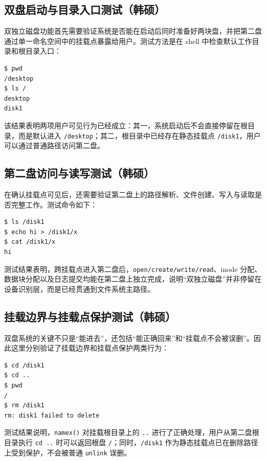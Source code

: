\documentclass[12pt,a4paper]{ctexart}
\begin{document}
\subsection{双盘启动与目录入口测试（韩硕）}

双独立磁盘功能首先需要验证系统是否能在启动后同时准备好两块盘，并把第二盘通过单一命名空间中的挂载点暴露给用户。测试方法是在 shell 中检查默认工作目录和根目录入口：

\begin{lstlisting}[caption={双盘启动后的入口检查}]
$ pwd
/desktop
$ ls /
desktop
disk1
\end{lstlisting}

该结果表明两项用户可见行为已经成立：其一，系统启动后不会直接停留在根目录，而是默认进入 \texttt{/desktop}；其二，根目录中已经存在静态挂载点 \texttt{/disk1}，用户可以通过普通路径访问第二盘。

\subsection{第二盘访问与读写测试（韩硕）}

在确认挂载点可见后，还需要验证第二盘上的路径解析、文件创建、写入与读取是否完整工作。测试命令如下：

\begin{lstlisting}[caption={第二盘读写测试}]
$ ls /disk1
$ echo hi > /disk1/x
$ cat /disk1/x
hi
\end{lstlisting}

测试结果表明，跨挂载点进入第二盘后，\texttt{open/create/write/read}、inode 分配、数据块分配以及日志提交均能在第二盘上独立完成，说明“双独立磁盘”并非停留在设备识别层，而是已经贯通到文件系统主路径。

\subsection{挂载边界与挂载点保护测试（韩硕）}

双盘系统的关键不只是“能进去”，还包括“能正确回来”和“挂载点不会被误删”。因此这里分别验证了挂载边界和挂载点保护两类行为：

\begin{lstlisting}[caption={挂载边界与保护测试}]
$ cd /disk1
$ cd ..
$ pwd
/
$ rm /disk1
rm: disk1 failed to delete
\end{lstlisting}

测试结果说明，\texttt{namex()} 对挂载根目录上的 \texttt{..} 进行了正确处理，用户从第二盘根目录执行 \texttt{cd ..} 时可以返回根盘 \texttt{/}；同时，\texttt{/disk1} 作为静态挂载点已在删除路径上受到保护，不会被普通 \texttt{unlink} 误删。
\end{document}
